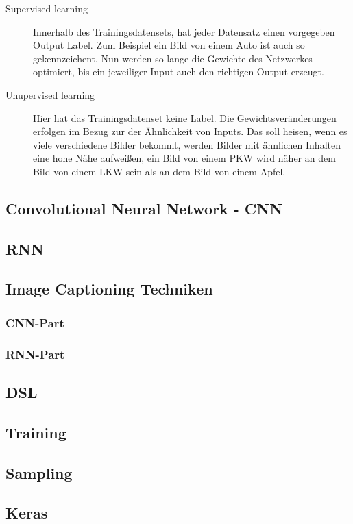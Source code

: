 \documentclass[pdftex,a4paper,halfparskip]{scrartcl}
\begin{document}
\begin{description}
	\item[Supervised learning] Innerhalb des Trainingsdatensets, hat jeder Datensatz einen vorgegeben Output Label. Zum Beispiel ein Bild von einem Auto ist auch so gekennzeichent. Nun werden so lange die Gewichte des Netzwerkes optimiert, bis ein jeweiliger Input auch den richtigen Output erzeugt.
	\item[Unupervised learning] Hier hat das Trainingsdatenset keine Label. Die Gewichtsveränderungen erfolgen im Bezug zur der Ähnlichkeit von Inputs. Das soll heisen, wenn es viele verschiedene Bilder bekommt, werden Bilder mit ähnlichen Inhalten eine hohe Nähe aufweißen, ein Bild von einem PKW wird näher an dem Bild von einem LKW sein als an dem Bild von einem Apfel.
\end{description}

\subsection{Convolutional Neural Network - CNN}

\subsection{RNN}
\subsection{Image Captioning Techniken}
\subsubsection{CNN-Part}
\subsubsection{RNN-Part}
\subsection{DSL}
\subsection{Training}
\subsection{Sampling}
\subsection{Keras}
\end{document}
